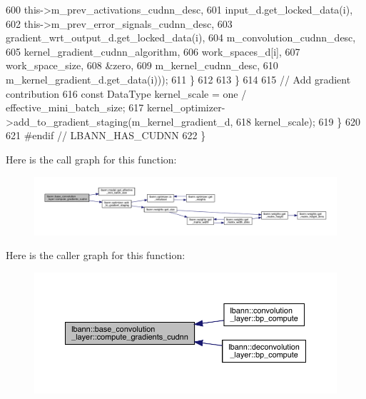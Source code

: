 \begin{DoxyCode}
600                                                      this->m\_prev\_activations\_cudnn\_desc,
601                                                      input\_d.get\_locked\_data(i),
602                                                      this->m\_prev\_error\_signals\_cudnn\_desc,
603                                                      gradient\_wrt\_output\_d.get\_locked\_data(i),
604                                                      m\_convolution\_cudnn\_desc,
605                                                      kernel\_gradient\_cudnn\_algorithm,
606                                                      work\_spaces\_d[i],
607                                                      work\_space\_size,
608                                                      &zero,
609                                                      m\_kernel\_cudnn\_desc,
610                                                      m\_kernel\_gradient\_d.get\_data(i)));
611         \}
612 
613       \}
614 
615       \textcolor{comment}{// Add gradient contribution}
616       \textcolor{keyword}{const} DataType kernel\_scale = one / effective\_mini\_batch\_size;
617       kernel\_optimizer->add\_to\_gradient\_staging(m\_kernel\_gradient\_d,
618                                                 kernel\_scale);
619     \}
620 
621 \textcolor{preprocessor}{  #endif // LBANN\_HAS\_CUDNN}
622   \}
\end{DoxyCode}
Here is the call graph for this function\+:\nopagebreak
\begin{figure}[H]
\begin{center}
\leavevmode
\includegraphics[width=350pt]{classlbann_1_1base__convolution__layer_ae46e6a975c443792c606817878dc4446_cgraph}
\end{center}
\end{figure}
Here is the caller graph for this function\+:\nopagebreak
\begin{figure}[H]
\begin{center}
\leavevmode
\includegraphics[width=350pt]{classlbann_1_1base__convolution__layer_ae46e6a975c443792c606817878dc4446_icgraph}
\end{center}
\end{figure}
